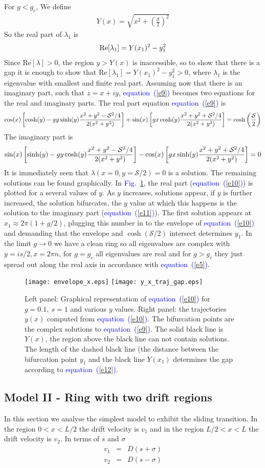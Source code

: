 \documentclass[aps,pre,floats,floatfix,fleqn,notitlepage]{revtex4-1}
\newcommand{\mylabel}[1]{\label{#1}}  %
\newcommand{\beq}{\begin{eqnarray}}
\newcommand{\eeq}{\end{eqnarray}}
\newcommand{\be}[1]{\begin{eqnarray}\ifthenelse{#1=-1}{\nonumber}{\ifthenelse{#1=0}{}{\mylabel{e#1}}}}
\newcommand{\ee}{\end{eqnarray}}
\newcommand{\Eq}[1]{\textcolor{blue}{equation~(\ref{#1})}} %
\newcommand{\Fig}[1] {\textcolor{blue}{Fig.~\ref{#1}}} %
\begin{document}
For $g<g_c$, 
%
We define 
%
\beq
Y(x) = \sqrt{x^2 + \left(\frac{\mathcal{S}}{2}\right)^2 }
\eeq
%
So the real part of $\lambda_1$ is 
%
\be{12}
\text{Re}[\lambda_1] = Y(x_1)^2-y_1^2
\ee
%
Since $\text{Re}[\lambda]>0$, the region $y>Y(x)$ is inaccessible, 
so to show that there is a gap it is enough to show that ${\text{Re}[\lambda_1]=Y(x_1)^2-y_1^2>0}$, where 
$\lambda_1$ is the eigenvalue with smallest and finite real part.
Assuming now that there is an imaginary part, such that $z= x+iy$,
\Eq{e9} becomes two equations for the real and imaginary parts. 
The real part equation \Eq{e9} is 
%
\be{10}
\cos (x) \left[ \cosh (y) - gy \sinh (y) \frac{x^2+y^2 - \mathcal{S}^2/4}{2(x^2+y^2)} \right]
+\sin(x) \left[ gx \cosh(y)\frac{x^2+y^2 + \mathcal{S}^2/4}{2(x^2+y^2)}   \right]
= \cosh\left(\frac{\mathcal{S}}{2}\right)
\ee
%
The imaginary part is 
%
\be{11}
\sin(x) \left[\sinh(y) - gy\cosh(y) \frac{x^2+y^2 - \mathcal{S}^2/4}{2(x^2+y^2)} \right]
-\cos(x) \left[gx \sinh(y)  \frac{x^2+y^2 + \mathcal{S}^2/4}{2(x^2+y^2)} \right] = 0
\ee
%
It is immediately seen that $\lambda(x=0,y=\mathcal{S}/2) = 0$ is a solution.
The remaining solutions can be found graphically.
%
In \Fig{fig2}, the real part (\Eq{e10}) is plotted for a several values of $y$. 
As $y$ increases, solutions appear, if $y$ is further increased, the solution bifurcates, the $y$ value at which this happens is the solution to the imaginary part (\Eq{e11}).
The first solution appears at $x_1\approx 2\pi(1+g/2)$, plugging this number in to the envelope of \Eq{e10} and demanding that the envelope and $\cosh(\mathcal{S}/2)$ intersect determines $y_1$.
%
In the limit $g\to 0$ we have a clean ring so all eigenvalues are complex with $y=is/2, x = 2\pi n$, for $g=g_c$ all eigenvalues are real and for $g>g_c$ they just spread out along the real axis in accordance with \Eq{e5}. 
%
\begin{figure}[h]
\texttt{[image: envelope\_x.eps]}
\texttt{[image: y\_x\_traj\_gap.eps]}
\caption{Left panel: Graphical representation of \Eq{e10} for $g=0.1, \ s=1$ and various $y$ values.
Right panel: the trajectories $y(x)$ computed from \Eq{e10}. The bifurcation points
are the complex solutions to \Eq{e9}. The solid black line is $Y(x)$, the region 
above the black line can not contain solutions. 
The  length of the dashed black line (the distance between the bifurcation point $y_1$ and the black line $Y(x_1)$ determines the gap according to \Eq{e12}.}
\label{fig2}
\end{figure}
%
\subsection{Model II - Ring with two drift regions}
In this section we analyse the simplest model to exhibit
the sliding transition.
In the region $0<x<L/2$ the drift velocity is $v_1$
and in the region $L/2<x<L$ the drift velocity is $v_2$.
In terms of $s$ and $\sigma$
%
\beq
v_1 &=& D(s+\sigma)\\
v_2 &=& D(s-\sigma)
\eeq
%
\end{document}
